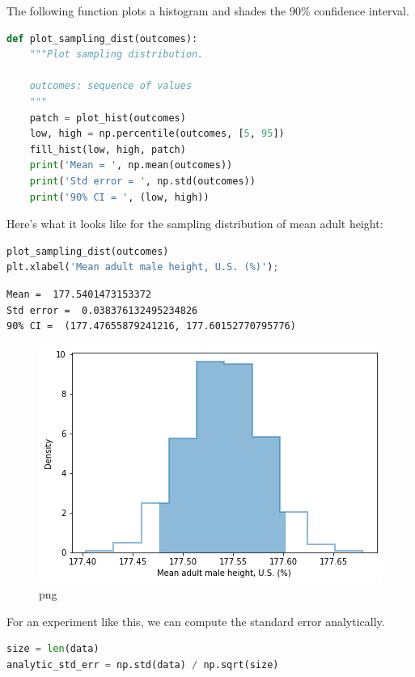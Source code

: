 The following function plots a histogram and shades the 90\% confidence
interval.

\begin{lstlisting}[language=Python,style=source]
def plot_sampling_dist(outcomes):
    """Plot sampling distribution.
    
    outcomes: sequence of values
    """
    patch = plot_hist(outcomes)
    low, high = np.percentile(outcomes, [5, 95])
    fill_hist(low, high, patch)
    print('Mean = ', np.mean(outcomes))
    print('Std error = ', np.std(outcomes))
    print('90% CI = ', (low, high))
\end{lstlisting}

Here's what it looks like for the sampling distribution of mean adult
height:

\begin{lstlisting}[language=Python,style=source]
plot_sampling_dist(outcomes)
plt.xlabel('Mean adult male height, U.S. (%)');
\end{lstlisting}

\begin{lstlisting}[style=output]
Mean =  177.5401473153372
Std error =  0.038376132495234826
90% CI =  (177.47655879241216, 177.60152770795776)
\end{lstlisting}

\begin{figure}
\centering
\includegraphics{11_inference_files/11_inference_113_1.png}
\caption{png}
\end{figure}

For an experiment like this, we can compute the standard error
analytically.

\begin{lstlisting}[language=Python,style=source]
size = len(data)
analytic_std_err = np.std(data) / np.sqrt(size)
\end{lstlisting}

